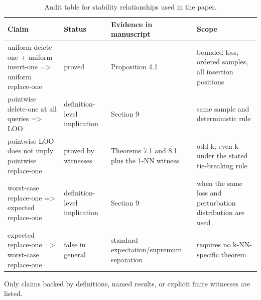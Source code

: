 \begin{table}[t]
\centering
\small
\begin{tabularx}{\linewidth}{@{}YYYY@{}}
\toprule
Claim & Status & Evidence in manuscript & Scope \\
\midrule
uniform delete-one + uniform insert-one => uniform replace-one & proved & Proposition 4.1 & bounded loss, ordered samples, all insertion positions \\
pointwise delete-one at all queries => LOO & definition-level implication & Section 9 & same sample and deterministic rule \\
pointwise LOO does not imply pointwise replace-one & proved by witnesses & Theorems 7.1 and 8.1 plus the 1-NN witness & odd k; even k under the stated tie-breaking rule \\
worst-case replace-one => expected replace-one & definition-level implication & Section 9 & when the same loss and perturbation distribution are used \\
expected replace-one => worst-case replace-one & false in general & standard expectation/supremum separation & requires no k-NN-specific theorem \\
\bottomrule
\end{tabularx}
\caption{Audit table for stability relationships used in the paper.}
\label{tab:stability-hierarchy}
{\footnotesize Only claims backed by definitions, named results, or explicit finite witnesses are listed.\par}
\end{table}
